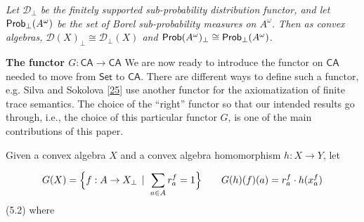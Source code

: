 \documentclass[11pt,a4paper]{amsart}
\begin{document}
\hypertarget{html:S5.Thmtheorem4.p1}{} \emph{Let %
\hypertarget{html:S5.Thmtheorem4.p1.m1}{}\({{\mathcal{D}}_{\bot}}\) be the finitely supported sub-probability distribution functor, and let %
\hypertarget{html:S5.Thmtheorem4.p1.m2}{}\({\text{\sf Prob}_{\bot}(A^{\omega})}\) be the set of Borel sub-probability measures on %
\hypertarget{html:S5.Thmtheorem4.p1.m3}{}\({A^{\omega}}\). Then as convex algebras, %
\hypertarget{html:S5.Thmtheorem4.p1.m4}{}\({{\mathcal{D}}(X)_{\bot}\cong{\mathcal{D}}_{\bot}(X)}\) and %
\hypertarget{html:S5.Thmtheorem4.p1.m5}{}\({\text{\sf Prob}(A^{\omega})_{\bot}\cong\text{\sf Prob}_{\bot}(A^{\omega})}\).}
\par\medskip
\hypertarget{html:S5.SS0.SSS0.Px1}{} \par\noindent\textbf{The functor %
\hypertarget{html:S5.SS0.SSS0.Px1.m1}{}\({G:\mathsf{CA}\to\mathsf{CA}}\)}\quad  %
\hypertarget{html:S5.SS0.SSS0.Px1.p1}{} We are now ready to introduce the functor on %
\hypertarget{html:S5.SS0.SSS0.Px1.p1.m1}{}\({\mathsf{CA}}\) needed to move from %
\hypertarget{html:S5.SS0.SSS0.Px1.p1.m2}{}\({\mathsf{Set}}\) to %
\hypertarget{html:S5.SS0.SSS0.Px1.p1.m3}{}\({\mathsf{CA}}\). There are different ways to define such a functor, e.g. Silva and Sokolova [\hyperlink{html:bib.bib25}{25}] use another functor for the axiomatization of finite trace semantics. The choice of the “right” functor so that our intended results go through, i.e., the choice of this particular functor %
\hypertarget{html:S5.SS0.SSS0.Px1.p1.m4}{}\({G}\), is one of the main contributions of this paper.
\par\medskip
\hypertarget{html:S5.SS0.SSS0.Px1.p2}{} Given a convex algebra %
\hypertarget{html:S5.SS0.SSS0.Px1.p2.m1}{}\({X}\) and a convex algebra homomorphism %
\hypertarget{html:S5.SS0.SSS0.Px1.p2.m2}{}\({h\colon X\to Y}\), let
\par\medskip
\hypertarget{html:S5.E2}{}   %
\hypertarget{html:S5.E2.m1}{}\[G(X)=\Big{\{}f:A\to X_{\bot}\,\mid\ \sum_{a\in A}r_{a}^{f}=1\Big{\}}\qquad G(h)(f)(a)=r_{a}^{f}\cdot h(x_{a}^{f})\]  (5.2)   where %
\end{document}
